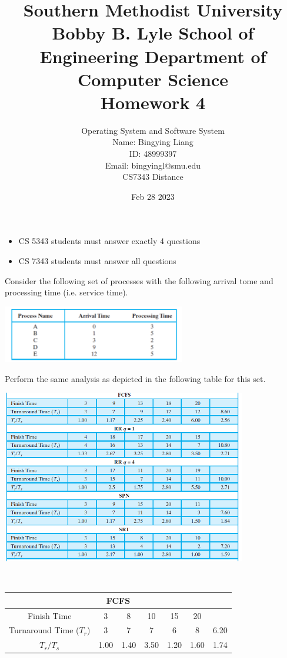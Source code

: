 \documentclass[12pt]{article}
\title{Southern Methodist University \\
Bobby B. Lyle School of Engineering Department of Computer Science \\
Homework 4
}
\author{Operating System and Software System \\
Name: Bingying Liang 
\\ ID: 48999397\\ 
Email: bingyingl@smu.edu \\ 
CS7343 Distance}
\date{Feb 28 2023}
\newenvironment{sol}[1][Solution]{\begin{trivlist}\item[\hskip\labelsep {\bfseries #1:}]}{\end{trivlist}}
\begin{document}
\maketitle
\begin{itemize}
    \item CS 5343 students must answer exactly 4 questions
    \item CS 7343 students must answer all questions
\end{itemize}
\begin{enumerate}
    \item Consider the following set of processes with the following arrival tome and processing time (i.e. service time).
    \begin{center}
        \includegraphics[width=0.6\textwidth]{1.png}
    \end{center}
    Perform the same analysis as depicted in the following table for this set.
    \begin{center}
        \includegraphics[width=0.8\textwidth]{2.png}
    \end{center}
    \begin{sol}
    \hspace*{\fill}\\
    \begin{center}
        
    \begin{tabular}{|c|c|c|c|c|c|c|}
        \hline
        \multicolumn{7}{|c|}{FCFS}  \\
        \hline 
         Finish Time & 3 & 8 & 10 & 15 & 20 & \\
        \hline
         Turnaround Time ($T_r$) & 3 & 7 & 7 & 6 & 8 & 6.20\\ 
        \hline
         $T_r / T_s$ & 1.00 & 1.40 & 3.50 & 1.20 & 1.60 & 1.74 \\
         \hline
         

\end{tabular}
\end{center}
\end{sol}
\end{enumerate}
\end{document}
